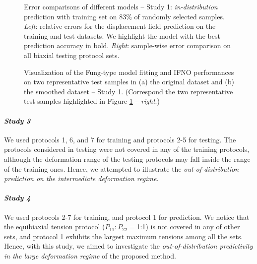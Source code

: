 \documentclass[twocolumn,10pt]{asme2ej}
\renewcommand{\~}{\tilde}
\renewcommand{\-}{\bar}
\newcommand{\8}{\infty}
\numberwithin{equation}{section}
\newcommand{\YY}[1]{{\color{red}#1}}
\begin{document}
\begin{figure*}[h!]
\caption{Error comparisons of different models -- Study 1: {\it in-distribution} prediction with training set on 83\% of randomly selected samples. {\it Left}: relative errors for the displacement field prediction on the training and test datasets. We highlight the model with the best prediction accuracy in bold. {\it Right}: sample-wise error comparison on all biaxial testing protocol sets.\vspace{15pt}}%
    \label{fig:loss_study1}
\end{figure*}

\begin{figure*}[h!]
    \centering
    \caption{Visualization of the Fung-type model fitting and IFNO performances on two representative test samples in (a) the original dataset and (b) the smoothed dataset -- Study 1. (Correspond the two representative test samples highlighted in Figure \ref{fig:loss_study1} -- {\it right}.)}
    \label{fig:unsmoothdata_study1}
\end{figure*}

\paragraph{\textit{Study 3}} 
We used protocols 1, 6, and 7 for training and protocols 2-5 for testing. 
The protocols considered in testing were not covered in any of the training protocols, although the deformation range of the testing protocols may fall inside the range of the training ones. Hence, we attempted to illustrate the {\it out-of-distribution prediction on the intermediate deformation regime}.

\paragraph{\textit{Study 4}} We used protocols 2-7 for training, and protocol 1 for prediction. We notice that the equibiaxial tension protocol ($P_{11}:P_{22}=$1:1) is not covered in any of other sets, and protocol 1 exhibits the largest maximum tensions among all the sets. Hence, with this study, we aimed to investigate the \textit{out-of-distribution predictivity in the large deformation regime} of the proposed method. %
\end{document}
